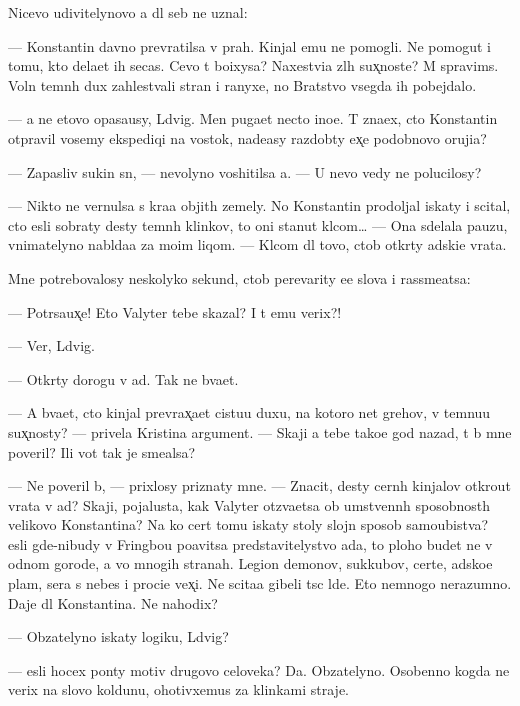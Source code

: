 \documentclass[10pt]{book}
\begin{document}
Nicevo udivitelynovo {\y}a dl{\ia} seb{\ia} ne uznal:

— Konstantin davno prevratilsa v prah. Kinjal{\yi} {\y}emu ne pomogli. Ne pomogut i tomu, kto dela{\y}et ih se{\y}cas. Cevo t{\yi} bo{\y}ixysa? Naxestvi{\y}a zl{\yi}h sux̨noste{\y}? M{\yi} spravims{\ia}. Voln{\yi} temn{\yi}h dux zahlest{\yi}vali stran{\yi} i ranyxe, no Bratstvo vsegda ih pobejdalo.

— {\Y}a ne etovo opasa{\y}usy, L{\iu}dvig. Men{\ia} puga{\y}et necto ino{\y}e. T{\yi} zna{\y}ex, cto Konstantin otpravil vosemy ekspediqi{\y} na vostok, nade{\y}asy razdob{\yi}ty {\y}ex̨e podobnovo oruji{\y}a?

— Zapasliv{\yi}{\y} sukin s{\yi}n, — nevolyno voshitilsa {\y}a. — U nevo vedy ne polucilosy?

— Nikto ne vernulsa s kra{\y}a objit{\yi}h zemely. No Konstantin prodoljal iskaty i scital, cto {\y}esli sobraty des{\ia}ty temn{\yi}h klinkov, to oni stanut kl{\iu}com… — Ona sdelala pauzu, vnimatelyno nabl{\iu}da{\y}a za mo{\y}im liqom. — Kl{\iu}com dl{\ia} tovo, ctob{\yi} otkr{\yi}ty adski{\y}e vrata.

Mne potrebovalosy neskolyko sekund, ctob{\yi} perevarity {\y}e{\y}e slova i rassme{\y}atsa:

— Potr{\ia}sa{\y}ux̨e! Eto Valyter tebe skazal? I t{\yi} {\y}emu verix?!

— Ver{\iu}, L{\iu}dvig.

— Otkr{\yi}ty dorogu v ad. Tak ne b{\yi}va{\y}et.

— A b{\yi}va{\y}et, cto kinjal prevrax̨a{\y}et cistu{\y}u duxu, na kotoro{\y} net grehov, v temnu{\y}u sux̨nosty? — privela Kristina argument. — Skaji {\y}a tebe tako{\y}e god nazad, t{\yi} b{\yi} mne poveril? Ili vot tak je sme{\y}alsa?

— Ne poveril b{\yi}, — prixlosy priznaty mne. — Znacit, des{\ia}ty cern{\yi}h kinjalov otkro{\y}ut vrata v ad? Skaji, pojalu{\y}sta, kak Valyter otz{\yi}va{\y}etsa ob umstvenn{\yi}h sposobnost{\ia}h velikovo Konstantina? Na ko{\y} cert tomu iskaty stoly slojn{\yi}{\y} sposob samoubi{\y}stva? {\Y}esli gde-nibudy v Fringbou po{\y}avitsa predstavitelystvo ada, to ploho budet ne v odnom gorode, a vo mnogih stranah. Legion{\yi} demonov, sukkubov, certe{\y}, adsko{\y}e plam{\ia}, sera s nebes i proci{\y}e vex̨i. Ne scita{\y}a gibeli t{\yi}s{\ia}c l{\iu}de{\y}. Eto nemnogo nerazumno. Daje dl{\ia} Konstantina. Ne nahodix?

— Ob{\ia}zatelyno iskaty logiku, L{\iu}dvig?

— {\Y}esli hocex pon{\ia}ty motiv{\yi} drugovo celoveka? Da. Ob{\ia}zatelyno. Osobenno kogda ne verix na slovo koldunu, ohotivxemus{\ia} za klinkami straje{\y}.
\end{document}
